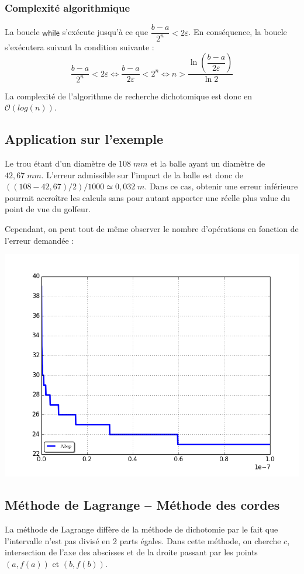 \documentclass[10pt]{article}
\begin{document}
\subsubsection{Complexité algorithmique}

La boucle $\textsf{while}$ s'exécute jusqu'à ce que $\dfrac{b-a}{2^n}<2\varepsilon$. En conséquence, la boucle s'exécutera suivant la condition suivante : 
$$\dfrac{b-a}{2^n}<2\varepsilon 
\Longleftrightarrow
\dfrac{b-a}{2\varepsilon}<2^n
\Longleftrightarrow
n> \dfrac{\ln\left(\dfrac{b-a}{2\varepsilon}\right)}{\ln 2}$$

La complexité de l'algorithme de recherche dichotomique est donc en $\mathcal{O}(log(n))$.

\subsection{Application sur l'exemple}

Le trou étant d'un diamètre de $108\;mm$ et la balle ayant un diamètre de $42,67\; mm$. L'erreur admissible sur l'impact de la balle est donc de $((108-42,67)/2)/1000 \simeq 0,032\; m$. Dans ce cas, obtenir une erreur inférieure pourrait accroître les calculs sans pour autant apporter une réelle plus value du point de vue du golfeur.

Cependant, on peut tout de même observer le nombre d'opérations en fonction de l'erreur demandée :


\begin{center}
\includegraphics[width=.6\textwidth]{images/courbe_erreur_dicho}
\end{center}


\subsection{Méthode de Lagrange -- Méthode des cordes}

La méthode de Lagrange diffère de la méthode de dichotomie par le fait que l'intervalle n'est pas divisé en 2 parts égales. Dans cette méthode, on cherche $c$, intersection de l'axe des abscisses et de la droite passant par les points $(a,f(a))$ et $(b,f(b))$.
\end{document}
